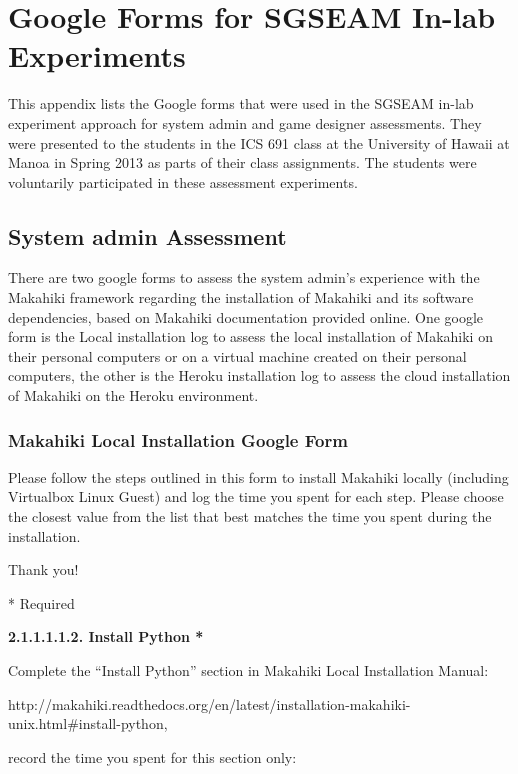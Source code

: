 \section{Google Forms for SGSEAM In-lab Experiments}
\label{app:googleform}

This appendix lists the Google forms that were used in the SGSEAM in-lab experiment approach for system admin and game designer assessments. They were presented to the students in the ICS 691 class at the University of Hawaii at Manoa in Spring 2013 as parts of their class assignments. The students were voluntarily participated in these assessment experiments.

\subsection{System admin Assessment}
\label{app:googleform-sysadmin}

There are two google forms to assess the system admin's experience with the Makahiki framework regarding the installation of Makahiki and its software dependencies, based on Makahiki documentation provided online. One google form is the Local installation log to assess the local installation of Makahiki on their personal computers or on a virtual machine created on their personal computers, the other is the Heroku installation log to assess the cloud installation of Makahiki on the Heroku environment.

\subsubsection{Makahiki Local Installation Google Form}

\setlength{\parindent}{0pt}
\setlength{\parskip}{3mm}

Please follow the steps outlined in this form to install Makahiki locally (including Virtualbox Linux Guest) and log the time you spent for each step.
Please choose the closest value from the list that best matches the time you spent during the installation.

Thank you!

* Required

{\bf 2.1.1.1.1.2. Install Python *}

Complete the ``Install Python'' section in Makahiki Local Installation Manual:

http://makahiki.readthedocs.org/en/latest/installation-makahiki-unix.html\#install-python,

record the time you spent for this section only:


